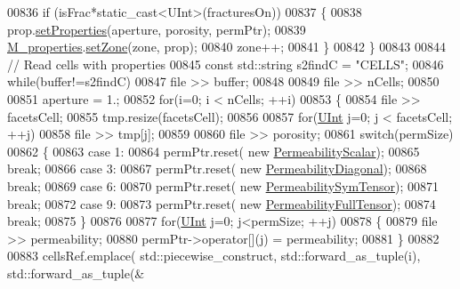 \begin{DoxyCode}
00836         \textcolor{keywordflow}{if} (isFrac*static\_cast<UInt>(fracturesOn))
00837         \{
00838             prop.\hyperlink{classFVCode3D_1_1Properties_a0ddb477254cfacdb96a440ddedc2548c}{setProperties}(aperture, porosity, permPtr);
00839             \hyperlink{classFVCode3D_1_1Importer_af678e18e971d5a132f5ba494981f6dae}{M\_properties}.\hyperlink{classFVCode3D_1_1PropertiesMap_ac303adadd1101e7bee62ecad0e8ea6ac}{setZone}(zone, prop);
00840             zone++;
00841         \}
00842     \}
00843 
00844     \textcolor{comment}{// Read cells with properties}
00845     \textcolor{keyword}{const} std::string s2findC = \textcolor{stringliteral}{"CELLS"};
00846     \textcolor{keywordflow}{while}(buffer!=s2findC)
00847         file >> buffer;
00848 
00849     file >> nCells;
00850 
00851     aperture = 1.;
00852     \textcolor{keywordflow}{for}(i=0; i < nCells; ++i)
00853     \{
00854         file >> facetsCell;
00855         tmp.resize(facetsCell);
00856 
00857         \textcolor{keywordflow}{for}(\hyperlink{namespaceFVCode3D_a4bf7e328c75d0fd504050d040ebe9eda}{UInt} j=0; j < facetsCell; ++j)
00858             file >> tmp[j];
00859 
00860         file >> porosity;
00861         \textcolor{keywordflow}{switch}(permSize)
00862         \{
00863             \textcolor{keywordflow}{case} 1:
00864                 permPtr.reset( \textcolor{keyword}{new} \hyperlink{classFVCode3D_1_1PermeabilityScalar}{PermeabilityScalar});
00865                 \textcolor{keywordflow}{break};
00866             \textcolor{keywordflow}{case} 3:
00867                 permPtr.reset( \textcolor{keyword}{new} \hyperlink{classFVCode3D_1_1PermeabilityDiagonal}{PermeabilityDiagonal});
00868                 \textcolor{keywordflow}{break};
00869             \textcolor{keywordflow}{case} 6:
00870                 permPtr.reset( \textcolor{keyword}{new} \hyperlink{classFVCode3D_1_1PermeabilitySymTensor}{PermeabilitySymTensor});
00871                 \textcolor{keywordflow}{break};
00872             \textcolor{keywordflow}{case} 9:
00873                 permPtr.reset( \textcolor{keyword}{new} \hyperlink{classFVCode3D_1_1PermeabilityFullTensor}{PermeabilityFullTensor});
00874                 \textcolor{keywordflow}{break};
00875         \}
00876 
00877         \textcolor{keywordflow}{for}(\hyperlink{namespaceFVCode3D_a4bf7e328c75d0fd504050d040ebe9eda}{UInt} j=0; j<permSize; ++j)
00878         \{
00879             file >> permeability;
00880             permPtr->operator[](j) = permeability;
00881         \}
00882 
00883         cellsRef.emplace( std::piecewise\_construct, std::forward\_as\_tuple(i), std::forward\_as\_tuple(&

\end{DoxyCode}
